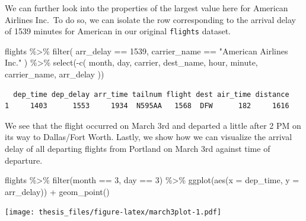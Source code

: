 \documentclass[12pt,twoside]{reedthesis}
\newenvironment{Shaded}{\begin{snugshade}}{\end{snugshade}}
\newcommand{\AttributeTok}[1]{\textcolor[rgb]{0.77,0.63,0.00}{#1}}
\newcommand{\DecValTok}[1]{\textcolor[rgb]{0.00,0.00,0.81}{#1}}
\newcommand{\FunctionTok}[1]{\textcolor[rgb]{0.00,0.00,0.00}{#1}}
\newcommand{\NormalTok}[1]{#1}
\newcommand{\SpecialCharTok}[1]{\textcolor[rgb]{0.00,0.00,0.00}{#1}}
\newcommand{\StringTok}[1]{\textcolor[rgb]{0.31,0.60,0.02}{#1}}
\begin{document}
We can further look into the properties of the largest value here for American Airlines Inc.~To do so, we can isolate the row corresponding to the arrival delay of 1539 minutes for American in our original \texttt{flights} dataset.
\begin{Shaded}
\begin{Highlighting}[]
\NormalTok{flights }\SpecialCharTok{\%\textgreater{}\%}
  \FunctionTok{filter}\NormalTok{(}
\NormalTok{    arr\_delay }\SpecialCharTok{==} \DecValTok{1539}\NormalTok{,}
\NormalTok{    carrier\_name }\SpecialCharTok{==} \StringTok{"American Airlines Inc."}
\NormalTok{  ) }\SpecialCharTok{\%\textgreater{}\%}
  \FunctionTok{select}\NormalTok{(}\SpecialCharTok{{-}}\FunctionTok{c}\NormalTok{(}
\NormalTok{    month, day, carrier, dest\_name, hour,}
\NormalTok{    minute, carrier\_name, arr\_delay}
\NormalTok{  ))}
\end{Highlighting}
\end{Shaded}
\begin{verbatim}
  dep_time dep_delay arr_time tailnum flight dest air_time distance
1     1403      1553     1934  N595AA   1568  DFW      182     1616
\end{verbatim}
We see that the flight occurred on March 3rd and departed a little after 2 PM on its way to Dallas/Fort Worth. Lastly, we show how we can visualize the arrival delay of all departing flights from Portland on March 3rd against time of departure.
\begin{Shaded}
\begin{Highlighting}[]
\NormalTok{flights }\SpecialCharTok{\%\textgreater{}\%}
  \FunctionTok{filter}\NormalTok{(month }\SpecialCharTok{==} \DecValTok{3}\NormalTok{, day }\SpecialCharTok{==} \DecValTok{3}\NormalTok{) }\SpecialCharTok{\%\textgreater{}\%}
  \FunctionTok{ggplot}\NormalTok{(}\FunctionTok{aes}\NormalTok{(}\AttributeTok{x =}\NormalTok{ dep\_time, }\AttributeTok{y =}\NormalTok{ arr\_delay)) }\SpecialCharTok{+}
  \FunctionTok{geom\_point}\NormalTok{()}
\end{Highlighting}
\end{Shaded}
\texttt{[image: thesis\_files/figure-latex/march3plot-1.pdf]}
\end{document}
